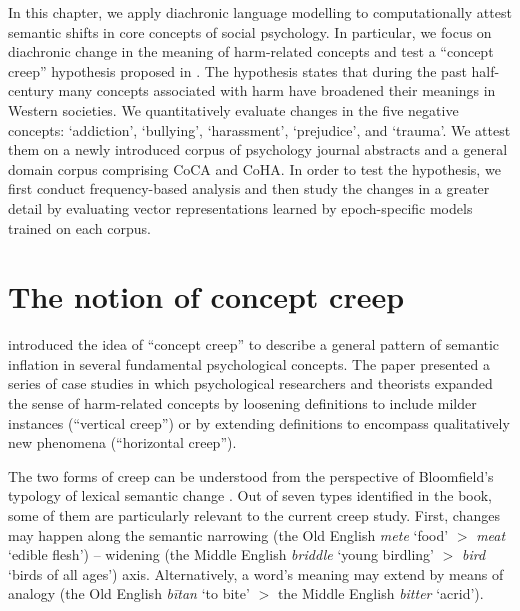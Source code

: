 \documentclass[output=paper]{langsci/langscibook}
\begin{document}
In this chapter, we apply diachronic language modelling to computationally attest semantic shifts in core concepts of social psychology. In particular, we focus on diachronic change in the meaning of harm-related concepts and test a ``concept creep'' hypothesis proposed in \citet{haslam2016concept}. The hypothesis states that during the past half-century many concepts associated with harm have broadened their meanings in Western societies.
We quantitatively evaluate changes in the five negative concepts: `addiction', `bullying', `harassment', `prejudice', and `trauma'. We attest them on a newly introduced corpus of psychology journal abstracts and a general domain corpus comprising CoCA and CoHA.
In order to test the hypothesis, we first conduct frequency-based analysis and then study the changes in a greater detail by evaluating vector representations learned by epoch-specific models trained on each corpus.


\section{The notion of concept creep}
\citet{haslam2016concept} introduced the idea of ``concept creep'' to describe a general pattern of semantic inflation in several fundamental psychological concepts. The paper presented a series of case studies in which psychological researchers and theorists expanded the sense of harm-related concepts by loosening definitions to include milder instances (``vertical creep'') or by extending definitions to encompass qualitatively new phenomena (``horizontal creep''). 

The two forms of creep can be understood from the perspective of Bloomfield's typology of lexical semantic change \citep{bloomfield-1933}. Out of seven types identified in the book, some of them are particularly relevant to the current creep study. First, changes may happen along the semantic narrowing (the Old English \textit{mete} `food' $>$  \textit{meat} `edible flesh') -- widening (the Middle English \textit{briddle} `young birdling' $>$ \textit{bird} `birds of all ages') axis. Alternatively, a word's meaning may extend by means of analogy (the Old English \textit{bītan} `to bite' $>$ the Middle English \textit{bitter} `acrid'). 
\end{document}
